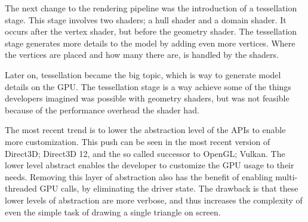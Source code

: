 The next change to the rendering pipeline was the introduction of a tessellation stage.
This stage involves two shaders; a hull shader and a domain shader.
It occurs after the vertex shader, but before the geometry shader.
The tessellation stage generates more details to the model by adding even more vertices.
Where the vertices are placed and how many there are, is handled by the shaders.

Later on, tessellation became the big topic, which is way to generate model details on the \gls{GPU}.
The tessellation stage is a way achieve some of the things developers imagined was possible with geometry shaders, but was not feasible because of the performance overhead the shader had.

The most recent trend is to lower the abstraction level of the \glspl{API} to enable more customization.
This push can be seen in the most recent version of Direct3D; Direct3D 12, and the so called successor to OpenGL; Vulkan.
The lower level abstract enables the developer to customize the \gls{GPU} usage to their needs.
Removing this layer of abstraction also has the benefit of enabling multi-threaded \gls{GPU} calls, by eliminating the driver state.
The drawback is that these lower levels of abstraction are more verbose, and thus increases the complexity of even the simple task of drawing a single triangle on screen.

